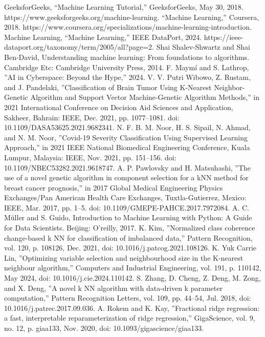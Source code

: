 \documentclass[conference]{IEEEtran}
\begin{document}
\begin{thebibliography}{00}
 GeeksforGeeks, “Machine Learning Tutorial,” GeeksforGeeks, May 30, 2018. https://www.geeksforgeeks.org/machine-learning.
 “Machine Learning,” Coursera, 2018. https://www.coursera.org/specializations/machine-learning-introduction.
 Machine Learning, “Machine Learning,” IEEE DataPort, 2024. https://ieee-dataport.org/taxonomy/term/2005/all?page=2.
 Shai Shalev-Shwartz and Shai Ben-David, Understanding machine learning: From foundations to algorithms. Cambridge Etc: Cambridge University Press, 2014.
 F. Maymí and S. Lathrop, ''AI in Cyberspace: Beyond the Hype,'' 2024.
 V. V. Putri Wibowo, Z. Rustam, and J. Pandelaki, ''Classification of Brain Tumor Using K-Nearest Neighbor-Genetic Algorithm and Support Vector Machine-Genetic Algorithm Methods,'' in 2021 International Conference on Decision Aid Sciences and Application, Sakheer, Bahrain: IEEE, Dec. 2021, pp. 1077--1081. doi: 10.1109/DASA53625.2021.9682341.
 N. F. B. M. Noor, H. S. Sipail, N. Ahmad, and N. M. Noor, ''Covid-19 Severity Classification Using Supervised Learning Approach,'' in 2021 IEEE National Biomedical Engineering Conference, Kuala Lumpur, Malaysia: IEEE, Nov. 2021, pp. 151--156. doi: 10.1109/NBEC53282.2021.9618747.
 A. P. Pawlovsky and H. Matsuhashi, ''The use of a novel genetic algorithm in component selection for a kNN method for breast cancer prognosis,'' in 2017 Global Medical Engineering Physics Exchanges/Pan American Health Care Exchanges, Tuxtla-Gutierrez, Mexico: IEEE, Mar. 2017, pp. 1--5. doi: 10.1109/GMEPE-PAHCE.2017.7972084.
 A. C. Müller and S. Guido, Introduction to Machine Learning with Python: A Guide for Data Scientists. Beijing: O'reilly, 2017.
 K. Kim, ''Normalized class coherence change-based k NN for classification of imbalanced data,'' Pattern Recognition, vol. 120, p. 108126, Dec. 2021, doi: 10.1016/j.patcog.2021.108126.
 K. Yuk Carrie Lin, ''Optimizing variable selection and neighbourhood size in the K-nearest neighbour algorithm,'' Computers and Industrial Engineering, vol. 191, p. 110142, May 2024, doi: 10.1016/j.cie.2024.110142.
 S. Zhang, D. Cheng, Z. Deng, M. Zong, and X. Deng, ''A novel k NN algorithm with data-driven k parameter computation,'' Pattern Recognition Letters, vol. 109, pp. 44--54, Jul. 2018, doi: 10.1016/j.patrec.2017.09.036.
 A. Rokem and K. Kay, ''Fractional ridge regression: a fast, interpretable reparameterization of ridge regression,'' GigaScience, vol. 9, no. 12, p. giaa133, Nov. 2020, doi: 10.1093/gigascience/giaa133.

\end{thebibliography}
\end{document}
